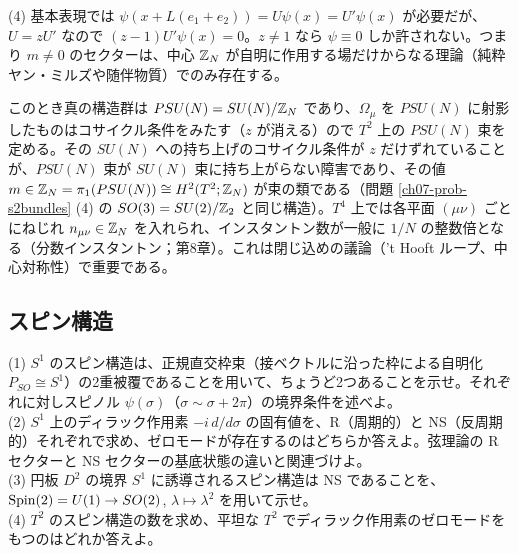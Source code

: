 \begin{solution}
(4) 基本表現では $\psi(x+L(e_1+e_2))=U\psi(x)=U'\psi(x)$ が必要だが、$U=zU'$ なので $(z-1)U'\psi(x)=0$。$z\neq1$ なら $\psi\equiv0$ しか許されない。つまり $m\neq0$ のセクターは、中心 $\mathbb{Z}_N$ が自明に作用する場だけからなる理論（純粋ヤン・ミルズや随伴物質）でのみ存在する。

このとき真の構造群は $PSU(N)=SU(N)/\mathbb{Z}_N$ であり、$\Omega_\mu$ を $PSU(N)$ に射影したものはコサイクル条件をみたす（$z$ が消える）ので $T^2$ 上の $PSU(N)$ 束を定める。その $SU(N)$ への持ち上げのコサイクル条件が $z$ だけずれていることが、$PSU(N)$ 束が $SU(N)$ 束に持ち上がらない障害であり、その値 $m\in\mathbb{Z}_N=\pi_1(PSU(N))\cong H^2(T^2;\mathbb{Z}_N)$ が束の類である（問題 \ref{ch07-prob-s2bundles} (4) の $SO(3)=SU(2)/\mathbb{Z}_2$ と同じ構造）。$T^4$ 上では各平面 $(\mu\nu)$ ごとにねじれ $n_{\mu\nu}\in\mathbb{Z}_N$ を入れられ、インスタントン数が一般に $1/N$ の整数倍となる（分数インスタントン；第8章）。これは閉じ込めの議論（'t Hooft ループ、中心対称性）で重要である。
\end{solution}

\subsection{スピン構造}

\begin{problem}[難易度 B]\label{ch07-prob-spins1}
(1) $S^1$ のスピン構造は、正規直交枠束（接ベクトルに沿った枠による自明化 $P_{SO}\cong S^1$）の2重被覆であることを用いて、ちょうど2つあることを示せ。それぞれに対しスピノル $\psi(\sigma)$（$\sigma\sim\sigma+2\pi$）の境界条件を述べよ。\\
(2) $S^1$ 上のディラック作用素 $-i\,d/d\sigma$ の固有値を、R（周期的）と NS（反周期的）それぞれで求め、ゼロモードが存在するのはどちらか答えよ。弦理論の R セクターと NS セクターの基底状態の違いと関連づけよ。\\
(3) 円板 $D^2$ の境界 $S^1$ に誘導されるスピン構造は NS であることを、$\operatorname{Spin}(2)=U(1)\to SO(2)$, $\lambda\mapsto\lambda^2$ を用いて示せ。\\
(4) $T^2$ のスピン構造の数を求め、平坦な $T^2$ でディラック作用素のゼロモードをもつのはどれか答えよ。
\end{problem}

